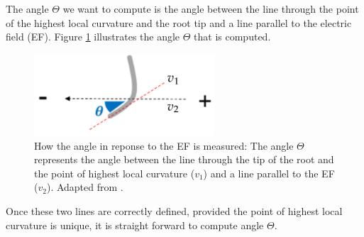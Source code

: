 The angle \(\Theta\) we want to compute is the angle between the line through the point of the highest local %
curvature and the root tip and a line parallel to the electric field (EF).  
Figure \ref{fig:angle} illustrates the angle \(\Theta\) that is computed. 


\begin{figure}[H]
	\centering
	\includegraphics[width=0.6\textwidth]{../Figures/angle2.png}
	\caption{How the angle in reponse to the EF is measured: The angle \( \Theta \) represents the angle between the line through the tip of the root and the point of highest local curvature (\( v_{1}\)) and a line parallel to the EF (\( v_{2} \)).
	Adapted from \cite{GExpCircuit}.}
	\label{fig:angle}
\end{figure}

Once these two lines are correctly defined, provided the point of highest local curvature is unique, it is straight forward to compute angle \(\Theta\).

%
%


